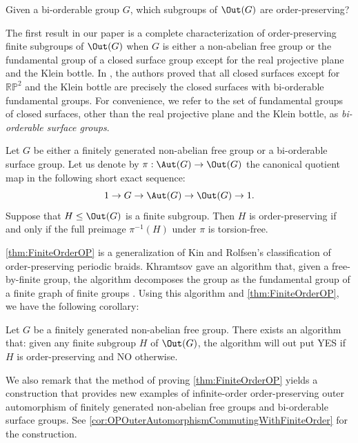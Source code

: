 \documentclass{amsart}
\begin{document}
\begin{quest}\label{quest:OPSubgroupOfOuter}
    Given a bi-orderable group $G$, which subgroups of $\Out(G)$ are order-preserving?
\end{quest}

The first result in our paper is a complete characterization of order-preserving finite subgroups of $\Out(G)$ when $G$ is either a non-abelian free group or the fundamental group of a closed surface group except for the real projective plane and the Klein bottle. In \cite{BoyerRolfsenWiest05}, the authors proved that all closed surfaces except for $\mathbb{RP}^2$ and the Klein bottle are precisely the closed surfaces with bi-orderable fundamental groups. For convenience, we refer to the set of fundamental groups of closed surfaces, other than the real projective plane and the Klein bottle, as \emph{bi-orderable surface groups}.

\begin{thm}\label{thm:FiniteOrderOP}
    Let $G$ be either a finitely generated non-abelian free group or a bi-orderable surface group. Let us denote by $\pi:\Aut(G) \to \Out(G)$ the canonical quotient map in the following short exact sequence:
    \[
    1 \to G \to \Aut(G) \to \Out(G) \to 1.
    \]
    Suppose that $H \leq \Out(G)$ is a finite subgroup. Then $H$ is order-preserving if and only if the full preimage $\pi^{-1}(H)$ under $\pi$ is torsion-free. 
\end{thm}

\cref{thm:FiniteOrderOP} is a generalization of Kin and Rolfsen's classification of order-preserving periodic braids\cite[Theorem 4.10]{KinRolfsen18}. Khramtsov gave an algorithm that, given a free-by-finite group, the algorithm decomposes the group as the fundamental group of a finite graph of finite groups \cite[Theorem 1]{Khramtsov95}. Using this algorithm and \cref{thm:FiniteOrderOP}, we have the following corollary:

\begin{cor}
\label{cor:OrderabilityFreeByFiniteIsAlgorthimicallyDeciable}
Let $G$ be a finitely generated non-abelian free group. There exists an algorithm that: given any finite subgroup $H$ of $\Out(G)$, the algorithm will out put YES if $H$ is order-preserving and NO otherwise.
\end{cor}
\noindent
We also remark that the method of proving \cref{thm:FiniteOrderOP} yields a construction that provides new examples of infinite-order order-preserving outer automorphism of finitely generated non-abelian free groups and bi-orderable surface groups. See \cref{cor:OPOuterAutomorphismCommutingWithFiniteOrder} for the construction.  
\end{document}
